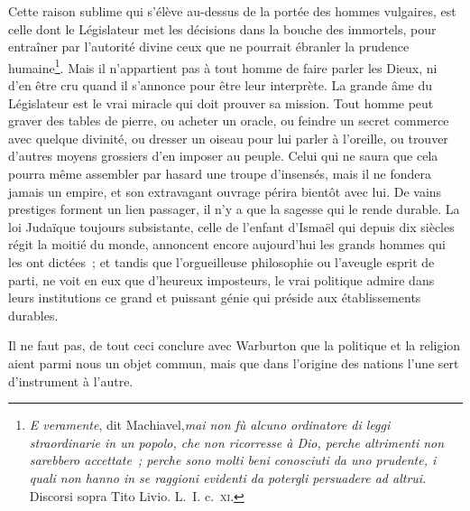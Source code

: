 \documentclass[french,twoside]{book} %
\begin{document}
Cette raison sublime qui s’élève au-dessus de la portée des hommes vulgaires, est celle dont le Législateur met les décisions dans la bouche des immortels, pour entraîner par l’autorité divine ceux que ne pourrait ébranler la prudence humaine\footnote{{\itshape E veramente}, dit Machiavel,{\itshape  mai non fù alcuno ordinatore di leggi straordinarie in un popolo, che non ricorresse à Dio, perche altrimenti non sarebbero accettate ; perche sono molti beni conosciuti da uno prudente, i quali non hanno in se raggioni evidenti da potergli persuadere ad altrui}. Discorsi sopra Tito Livio. L. I. c. \textsc{xi}.}. Mais il n’appartient pas à tout homme de faire parler les Dieux, ni d’en être cru quand il s’annonce pour être leur interprète. La grande âme du Législateur est le vrai miracle qui doit prouver sa mission. Tout homme peut graver des tables de pierre, ou acheter un oracle, ou feindre un secret commerce avec quelque divinité, ou dresser un oiseau pour lui parler à l’oreille, ou trouver d’autres moyens grossiers d’en imposer au peuple. Celui qui ne saura que cela pourra même assembler par hasard une troupe d’insensés, mais il ne fondera jamais un empire, et son extravagant ouvrage périra bientôt avec lui. De vains prestiges forment un lien passager, il n’y a que la sagesse qui le rende durable. La loi Judaïque toujours subsistante, celle de l’enfant d’Ismaël qui depuis dix siècles régit la moitié du monde, annoncent encore aujourd’hui les grands hommes qui les ont dictées ; et tandis que l’orgueilleuse philosophie ou l’aveugle esprit de parti, ne voit en eux que d’heureux imposteurs, le vrai politique admire dans leurs institutions ce grand et puissant génie qui préside aux établissements durables.\par
Il ne faut pas, de tout ceci conclure avec Warburton que la politique et la religion aient parmi nous un objet commun, mais que dans l’origine des nations l’une sert d’instrument à l’autre.
\end{document}
